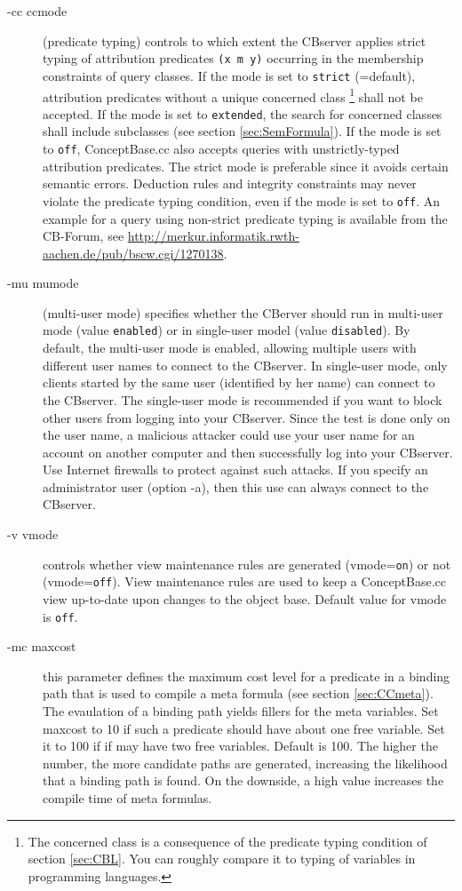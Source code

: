 \begin{description}
\item[-cc ccmode] (predicate typing) controls to which extent the CBserver
applies strict typing of
attribution predicates {\tt (x m y)} occurring in the membership constraints
of query classes.
If the mode is set to {\tt strict} (=default), attribution predicates without a unique
concerned class%
\footnote{The concerned class is a consequence of the predicate typing condition
of section \ref{sec:CBL}. You can roughly compare it to typing of variables
in programming languages.}
shall not be accepted.
If the mode is set to {\tt extended}, the search for concerned classes shall include
subclasses (see section \ref{sec:SemFormula}). 
If the mode is set to {\tt off}, ConceptBase.cc
also accepts queries with unstrictly-typed attribution predicates.
The strict mode is preferable since it avoids certain semantic errors.
Deduction rules and integrity constraints may never violate the
predicate typing condition, even if the mode is set to {\tt off}.
An example for a query using non-strict predicate typing is available from 
the CB-Forum, see \url{http://merkur.informatik.rwth-aachen.de/pub/bscw.cgi/1270138}.

\item[-mu mumode] (multi-user mode) specifies whether the CBerver should
run in multi-user mode (value {\tt enabled}) or in single-user model (value {\tt disabled}).
By default, the multi-user mode is enabled, allowing multiple users with different user
names to connect to the CBserver. In single-user mode, only clients started
by the same user (identified by her name) can connect to the CBserver.
The single-user mode is recommended if you want to block other users from logging
into your CBserver. Since the test is done only on the user name, a malicious
attacker could use your user name for an account on another computer and then
successfully log into your CBserver. Use Internet firewalls to protect
against such attacks. If you specify an administrator user (option -a), then
this use can always connect to the CBserver.

\item[-v vmode] controls whether view maintenance rules are generated (vmode={\tt on})
or not (vmode={\tt off}). View maintenance rules are used to keep a ConceptBase.cc
view up-to-date upon changes to the object base. Default value for vmode is {\tt off}.

\item[-mc maxcost] this parameter defines the maximum cost level for a predicate in a 
binding path that is used to compile a meta formula (see section \ref{sec:CCmeta}). 
The evaulation of a binding path yields fillers for the meta variables. Set maxcost to
10 if such a predicate should have about one free variable. Set it to 100 if
if may have two free variables. Default is 100. The higher the number, the more
candidate paths are generated, increasing the likelihood that a binding path is 
found. On the downside, a high value increases the compile time of meta formulas.


\end{description}
